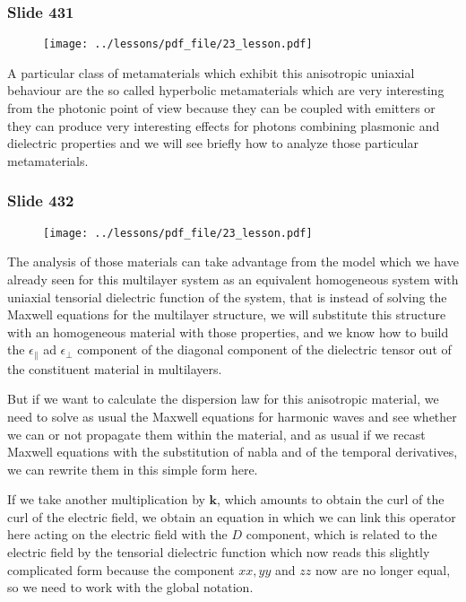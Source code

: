 \documentclass[../main/main.tex]{subfiles}
\begin{document}
\newpage

\subsubsection{Slide 431}

\begin{figure}[h!]
\centering
\texttt{[image: ../lessons/pdf\_file/23\_lesson.pdf]}
\end{figure}

A particular class of metamaterials which exhibit this anisotropic uniaxial behaviour are the so called hyperbolic metamaterials which are very interesting from the photonic point of view because they can be coupled with emitters or they can produce very interesting effects for photons combining plasmonic and dielectric properties and we will see briefly how to analyze those particular metamaterials.

\newpage

\subsubsection{Slide 432}

\begin{figure}[h!]
\centering
\texttt{[image: ../lessons/pdf\_file/23\_lesson.pdf]}
\end{figure}

The analysis of those materials can take advantage from the model which we have already seen for this multilayer system as an equivalent homogeneous system with uniaxial tensorial dielectric function of the system, that is instead of solving the Maxwell equations for the multilayer structure, we will substitute this structure with an homogeneous material with those properties, and we know how to build the $\epsilon_{\parallel}$ ad $\epsilon_{\perp}$ component of the diagonal component of the dielectric tensor out of the constituent material in multilayers. 

But if we want to calculate the dispersion law for this anisotropic material, we need to solve as usual the Maxwell equations for harmonic waves and see whether we can or not propagate them within the material, and as usual if we recast Maxwell equations with the substitution of nabla and of the temporal derivatives, we can rewrite them in this simple form here.

If we take another multiplication by $\mathbf{k}$, which amounts to obtain the curl of the curl of the electric field, we obtain an equation in which we can link this operator here acting on the electric field with the $D$ component, which is related to the electric field by the tensorial dielectric function which now reads this slightly complicated form because the component $xx, yy$ and $zz$ now are no longer equal, so we need to work with the global notation.
\end{document}
